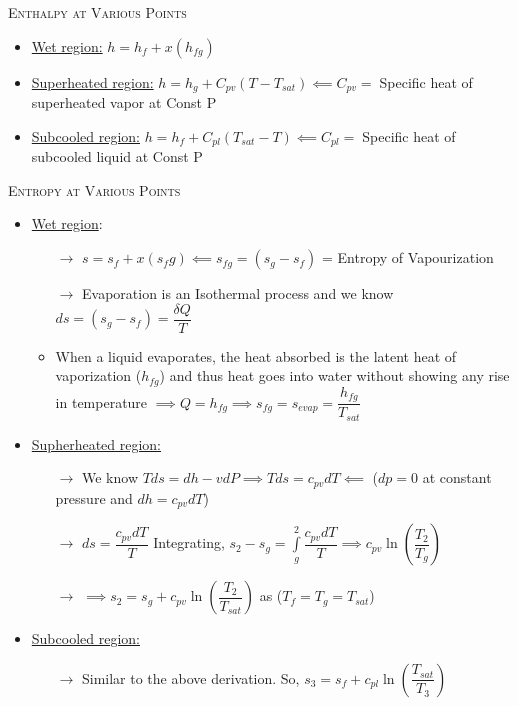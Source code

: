 \documentclass[8pt]{article}
\begin{document}
	\\\\
\textsc{Enthalpy at Various Points}
	\begin{itemize}
		\item \underline{Wet region:} $\boxed{h = h_f + x(h_{fg})}$
		\item \underline{Superheated region:} $\boxed{h = h_g + C_{pv}(T-T_{sat})} \impliedby C_{pv} =\;$Specific heat of superheated vapor at Const P
		\item \underline{Subcooled region:} $\boxed{h = h_f+C_{pl}(T_{sat}-T)} \impliedby C_{pl} =\;$Specific heat of subcooled liquid at Const P
	\end{itemize}
\textsc{Entropy at Various Points}
	\begin{itemize}
		\item \underline{Wet region}:
			\begin{itemize}
				\item[$\rightarrow$] $s = s_f+x(s_fg) \impliedby s_{fg} = (s_g - s_f)$ = Entropy of Vapourization
				\item[$\rightarrow$] Evaporation is an Isothermal process and we know $ds = (s_g - s_f)=\dfrac{\delta Q}{T}$
				\item When a liquid evaporates, the heat absorbed is the latent heat of vaporization ($h_{fg}$) and thus heat goes into water without showing any rise in temperature $\implies Q = h_{fg} \implies \boxed{s_{fg} = s_{evap} = \dfrac{h_{fg}}{T_{sat}}}$ 
			\end{itemize}
		\item \underline{Supherheated region:}
			\begin{itemize}
				\item[$\rightarrow$] We know $Tds = dh - vdP \implies Tds = c_{pv}dT \impliedby$ ($dp=0$ at constant pressure and $dh = c_{pv}dT$)
				\item[$\rightarrow$] $ds = \dfrac{c_{pv}dT}{T}$ Integrating, $s_2-s_g = \int\limits_g^2\dfrac{c_{pv}dT}{T} \implies c_{pv}\ln\left(\dfrac{T_2}{T_g}\right)$
				\item[$\rightarrow$] $\implies \boxed{s_2 = s_g + c_{pv}\ln\left(\dfrac{T_2}{T_{sat}}\right)}$ as ($T_f=T_g=T_{sat}$)
			\end{itemize}
		\item \underline{Subcooled region:}
			\begin{itemize}
				\item[$\rightarrow$] Similar to the above derivation. So, $\boxed{s_3 = s_f + c_{pl}\ln\left(\dfrac{T_{sat}}{T_3}\right)}$
			\end{itemize}
	\end{itemize}\hrulefill\\\\
\end{document}
